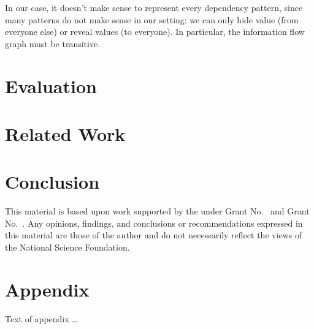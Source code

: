 \documentclass[acmsmall,review,anonymous]{acmart}\settopmatter{printfolios=true,printccs=false,printacmref=false}
\begin{document}
In our case, it doesn't make sense to represent every dependency pattern, since many patterns do not make sense in our setting: we can only hide value (from everyone else) or reveal values (to everyone). In particular, the information flow graph must be transitive.

\section{Evaluation}

\section{Related Work}

\section{Conclusion}

\begin{acks}                            %
  This material is based upon work supported by the
   under Grant
  No.~ and Grant
  No.~.  Any opinions, findings, and
  conclusions or recommendations expressed in this material are those
  of the author and do not necessarily reflect the views of the
  National Science Foundation.
\end{acks}





\appendix
\section{Appendix}

Text of appendix \ldots
\end{document}
